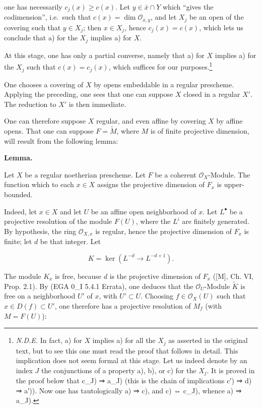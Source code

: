 \documentclass[
]{article}
\begin{document}
one has necessarily \(c_{j}(x) \geqslant c(x)\). Let
\(y \in \bar{x} \cap Y\) which ``gives the codimension'', i.e.~such that
\(c(x) = \dim \mathcal{O}_{\bar{x}, y}\), and let \(X_{j}\) be an open
of the covering such that \(y \in X_{j}\); then \(x \in X_{j}\), hence
\(c_{j}(x) = c(x)\), which lets us conclude that a) for the \(X_{j}\)
implies a) for \(X\).

At this stage, one has only a partial converse, namely that a) for \(X\)
implies a) for the \(X_{j}\) such that \(c(x) = c_{j}(x)\), which
suffices for our purposes.\footnote{\emph{N.D.E.} In fact, a) for \(X\)
  implies a) for all the \(X_{j}\) as asserted in the original text, but
  to see this one must read the proof that follows in detail. This
  implication does not seem formal at this stage. Let us indeed denote
  by an index \(J\) the conjunctions of a property a), b), or c) for the
  \(X_{j}\). It is proved in the proof below that c\_J) ⇒ a\_J) (this is
  the chain of implications c′) ⇒ d) ⇒ a′)). Now one has tautologically
  a) ⇒ c), and c) ⇔ c\_J), whence a) ⇒ a\_J).}

One chooses a covering of \(X\) by opens embeddable in a regular
prescheme. Applying the preceding, one sees that one can suppose \(X\)
closed in a regular \(X'\). The reduction to \(X'\) is then immediate.

One can therefore suppose \(X\) regular, and even affine by covering
\(X\) by affine opens. That one can suppose \(F = \tilde{M}\), where
\(M\) is of finite projective dimension, will result from the following
lemma:

\textbf{Lemma.}

Let \(X\) be a regular noetherian prescheme. Let \(F\) be a coherent
\(\mathcal{O}_{X}\)-Module. The function which to each \(x \in X\)
assigns the projective dimension of \(F_{x}\) is upper-bounded.

Indeed, let \(x \in X\) and let \(U\) be an affine open neighborhood of
\(x\). Let \(L^{\bullet}\) be a projective resolution of the module
\(F(U)\), where the \(L^{i}\) are finitely generated. By hypothesis, the
ring \(\mathcal{O}_{X,x}\) is regular, hence the projective dimension of
\(F_{x}\) is finite; let \(d\) be that integer. Let

\[
K = \ker(L^{-d} \to L^{-d+1}).
\]

The module \(K_{x}\) is free, because \(d\) is the projective dimension
of \(F_{x}\) ({[}M{]}, Ch. VI, Prop. 2.1). By (EGA 0\_I 5.4.1 Errata),
one deduces that the \(\mathcal{O}_{U}\)-Module \(\tilde{K}\) is free on
a neighborhood \(U'\) of \(x\), with \(U' \subset U\). Choosing
\(f \in \mathcal{O}_{X}(U)\) such that \(x \in D(f) \subset U'\), one
therefore has a projective resolution of \(M_{f}\) (with \(M = F(U)\)):
\end{document}
